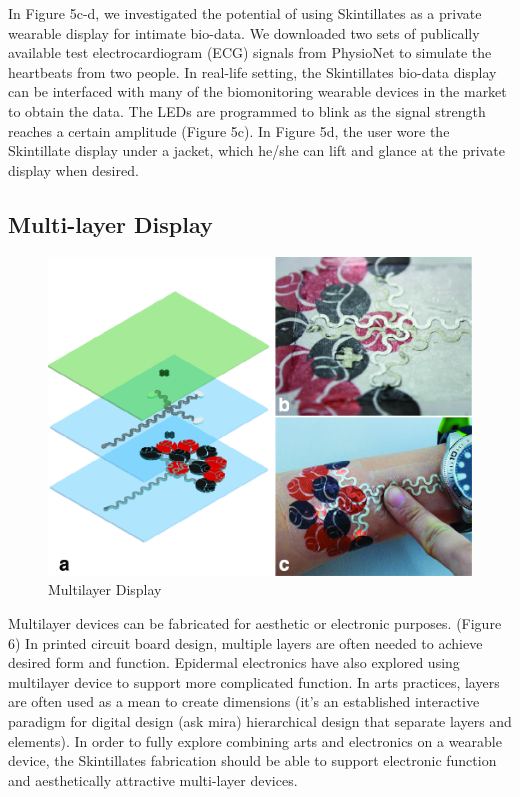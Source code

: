\documentclass{sigchi}
\begin{document}
In Figure 5c-d, we investigated the potential of using Skintillates as a private wearable display for intimate bio-data. We downloaded two sets of publically available test electrocardiogram (ECG) signals from PhysioNet to simulate the heartbeats from two people. In real-life setting, the Skintillates bio-data display can be interfaced with many of the biomonitoring wearable devices in the market to obtain the data. %
The LEDs are programmed to blink as the signal strength reaches a certain amplitude (Figure 5c). In Figure 5d, the user wore the Skintillate display under a jacket, which he/she can lift and glance at the private display when desired. %

\subsection{Multi-layer Display}
\begin{figure}[!h]
\centering
\includegraphics[width=1\columnwidth]{figures/Figure6}
\caption{Multilayer Display}
\label{fig:figure6}
\end{figure}
Multilayer devices can be fabricated for aesthetic or electronic purposes. (Figure 6) In printed circuit board design, multiple layers are often needed to achieve desired form and function. Epidermal electronics have also explored using multilayer device to support more complicated function. In arts practices, layers are often used as a mean to create dimensions (it's an established interactive paradigm for digital design (ask mira) hierarchical design that separate layers and elements). In order to fully explore combining arts and electronics on a wearable device, the Skintillates fabrication should be able to support electronic function and aesthetically attractive multi-layer devices.  
\end{document}
